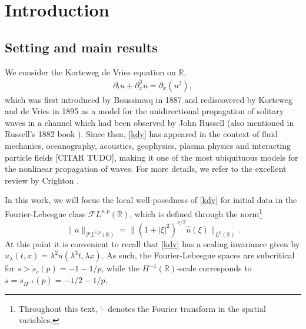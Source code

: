 \documentclass[%
11pt,  reqno]{amsart}
\newcommand{\blue}{\color{blue}}
\newcommand{\5}{\textup{V}}
\newcommand{\FL}{\mathcal{F} L}
\newcommand{\dx}{\partial_x}
\newcommand{\dt}{\partial_t}
\theoremstyle{remark}
\newcommand{\R}{\mathbb{R}}
\newcommand{\T}{\mathbb{T}}
\numberwithin{equation}{section}
\numberwithin{theorem}{section}
\begin{document}
		
		
		
		
		
    
	
	\section{Introduction}
	\subsection{Setting and main results}
	We consider the Korteweg de Vries equation on $\R$,
	\begin{align}
		\label{kdv}\tag{KdV}
		\dt u + \dx^3 u = \dx(u^2),
	\end{align}
	which was first introduced by Boussinesq in 1887 \cite{Boussinesq} and rediscovered by Korteweg and de Vries in 1895 \cite{KortewegDeVries} as a model for the unidirectional propagation of solitary waves in a channel which had been observed by John Russell (also mentioned in Russell's 1882 book \cite{Russell}). Since then, \eqref{kdv} has appeared in the context of fluid mechanics, oceanography, acoustics, geophysics, plasma physics and interacting particle fields [CITAR TUDO], making it one of the most ubiquituous models for the nonlinear propagation of waves. For more details, we refer to the excellent review by Crighton \cite{Crighton}.
	
	\medskip
	
	
	In this work, we will focus the local well-posedness of \eqref{kdv} for initial data in the Fourier-Lebesgue class $\mathcal{F}L^{s,p}(\R)$, which is defined through the norm\footnote{Throughout this text, $\hat{\cdot}$ denotes the Fourier transform in the spatial variables.}
	\begin{equation}
		\|u\|_{\mathcal{F}L^{s,p}(\R)}=\|(1+|\xi|^2)^{s/2}\hat{u}(\xi)\|_{L^p(\R)}.
	\end{equation}
	At this point it is convenient to recall that \eqref{kdv} has a scaling invariance given by $u_\lambda(t,x)=\lambda^{2}u(\lambda^3 t, \lambda x)$. As such, the Fourier-Lebesgue spaces are subcritical for $s>s_c(p)=-1-1/p$, while the $H^{-1}(\R)$-scale corresponds to $s=s_{H^{-1}}(p)=-1/2-1/p$. 
	
\end{document}
